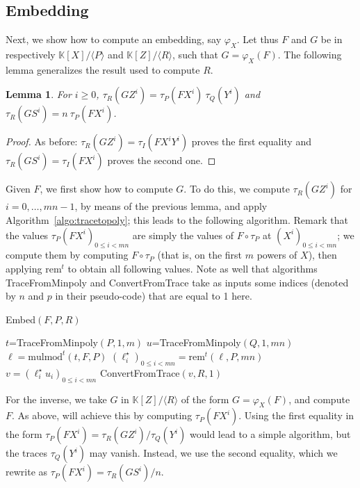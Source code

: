 \documentclass[12pt]{article}
\def\K {\ensuremath{\mathbb{K}}}
\def\rem {\ensuremath{\mathrm{rem}}}
\def\mulmod {\ensuremath{\mathrm{mulmod}}}
\newtheorem{Lemma}{Lemma}
\begin{document}

\subsection{Embedding} 

Next, we show how to compute an embedding, say $\varphi_X$. Let thus
$F$ and $G$ be in respectively $\K[X]/\langle P \rangle$ and
$\K[Z]/\langle R \rangle$, such that $G=\varphi_X(F)$.  The following
lemma generalizes the result used to compute $R$.

\begin{Lemma}
  For $i \ge 0$, $\tau_R(G Z^i) = \tau_P(F X^i) \ \tau_Q(Y^i)$ and
  $\tau_R(G S^i) = n\ \tau_P(F X^i)$.
\end{Lemma}
\begin{proof}
As before: $\tau_R(G Z^i) = \tau_I(F X^i Y^i)$ proves the first
equality and $\tau_R(G S^i) = \tau_I(F X^i)$ proves the second one.
\end{proof}

Given $F$, we first show how to compute $G$. To do this, we compute
$\tau_R(G Z^i)$ for $i=0,\dots,mn-1$, by means of the previous lemma,
and apply Algorithm~\ref{algo:tracetopoly}; this leads to the
following algorithm. Remark that the values $\tau_P(F X^i)_{0 \le i <
  mn}$ are simply the values of $F \circ \tau_P$ at $(X^i)_{0 \le i <
  mn}$; we compute them by computing $F \circ \tau_P$ (that is, on the
first $m$ powers of $X$), then applying $\rem^t$ to obtain all
following values. Note as well that algorithms TraceFromMinpoly and
ConvertFromTrace take as inputs some indices (denoted by $n$ and $p$
in their pseudo-code) that are equal to 1 here.

\begin{algorithm}[H]
  \caption{Embed$(F,P,R)$}
  \begin{algorithmic}[1]
    \STATE $t$=TraceFromMinpoly$(P,1,m)$
  \STATE $u$=TraceFromMinpoly$(Q,1,mn)$
  \STATE\label{algo:embed:2} $\ell = \mulmod^t(t,F,P)$
  \STATE $(\ell^\star_i)_{0 \le i < mn} = \rem^t(\ell, P, mn)$
  \STATE $v=(\ell^\star_i u_i)_{0 \le i < mn}$
  \RETURN ConvertFromTrace$(v, R, 1)$
  \end{algorithmic}
  \label{algo:embed}
\end{algorithm}

For the inverse, we take $G$ in $\K[Z]/\langle R \rangle$ of the form
$G=\varphi_X(F)$, and compute $F$. As above, will achieve this by
computing $\tau_P(F X^i)$. Using the first equality in the form $
\tau_P(F X^i) =\tau_R(G Z^i)/\tau_Q(Y^i)$ would lead to a simple
algorithm, but the traces $\tau_Q(Y^i)$ may vanish. Instead, we use
the second equality, which we rewrite as $\tau_P(F X^i) =\tau_R(G
S^i)/n$.
\end{document}
